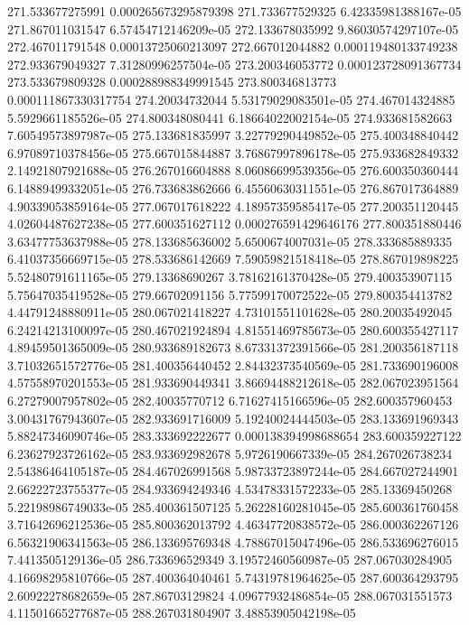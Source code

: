 {271.533677275991 0.000265673295879398
271.733677529325 6.42335981388167e-05
271.867011031547 6.57454712146209e-05
272.133678035992 9.86030574297107e-05
272.467011791548 0.00013725060213097
272.667012044882 0.000119480133749238
272.933679049327 7.31280996257504e-05
273.200346053772 0.000123728091367734
273.533679809328 0.000288988349991545
273.800346813773 0.000111867330317754
274.20034732044 5.53179029083501e-05
274.467014324885 5.5929661185526e-05
274.800348080441 6.18664022002154e-05
274.933681582663 7.60549573897987e-05
275.133681835997 3.22779290449852e-05
275.400348840442 6.97089710378456e-05
275.667015844887 3.76867997896178e-05
275.933682849332 2.14921807921688e-05
276.267016604888 8.06086699539356e-05
276.600350360444 6.14889499332051e-05
276.733683862666 6.45560630311551e-05
276.867017364889 4.90339053859164e-05
277.067017618222 4.18957359585417e-05
277.200351120445 4.02604487627238e-05
277.600351627112 0.000276591429646176
277.800351880446 3.63477753637988e-05
278.133685636002 5.6500674007031e-05
278.333685889335 6.41037356669715e-05
278.533686142669 7.59059821518418e-05
278.867019898225 5.52480791611165e-05
279.13368690267 3.78162161370428e-05
279.400353907115 5.75647035419528e-05
279.66702091156 5.77599170072522e-05
279.800354413782 4.44791248880911e-05
280.067021418227 4.73101551101628e-05
280.20035492045 6.24214213100097e-05
280.467021924894 4.81551469785673e-05
280.600355427117 4.89459501365009e-05
280.933689182673 8.67331372391566e-05
281.200356187118 3.71032651572776e-05
281.400356440452 2.84432373540569e-05
281.733690196008 4.57558970201553e-05
281.933690449341 3.86694488212618e-05
282.067023951564 6.27279007957802e-05
282.40035770712 6.71627415166596e-05
282.600357960453 3.00431767943607e-05
282.933691716009 5.19240024444503e-05
283.133691969343 5.88247346090746e-05
283.333692222677 0.000138394998688654
283.600359227122 6.23627923726162e-05
283.933692982678 5.9726190667339e-05
284.267026738234 2.54386464105187e-05
284.467026991568 5.98733723897244e-05
284.667027244901 2.66222723755377e-05
284.933694249346 4.53478331572233e-05
285.13369450268 5.22198986749033e-05
285.400361507125 5.26228160281045e-05
285.600361760458 3.71642696212536e-05
285.800362013792 4.46347720838572e-05
286.000362267126 6.56321906341563e-05
286.133695769348 4.78867015047496e-05
286.533696276015 7.4413505129136e-05
286.733696529349 3.19572460560987e-05
287.067030284905 4.16698295810766e-05
287.400364040461 5.74319781964625e-05
287.600364293795 2.60922278682659e-05
287.86703129824 4.09677932486854e-05
288.067031551573 4.11501665277687e-05
288.267031804907 3.48853905042198e-05
}
